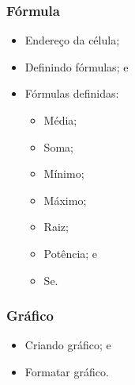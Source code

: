 \documentclass[aspectratio=169]{beamer} %
\begin{document}
\begin{frame}
	\frametitle{Fórmula}
			
	\begin{itemize} 
		\item Endereço da célula;
		\item Definindo fórmulas; e
		\item Fórmulas definidas:
			\begin{itemize} 
				\item Média; 
				\item Soma; 
				\item Mínimo; 
				\item Máximo; 
				\item Raiz; 
				\item Potência; e 
				\item Se.
			\end{itemize}
	\end{itemize}
\end{frame}

\begin{frame}
	\frametitle{Gráfico}
			
	\begin{itemize} 
		\item Criando gráfico; e 
		\item Formatar gráfico.
	\end{itemize}
\end{frame}
\end{document}
